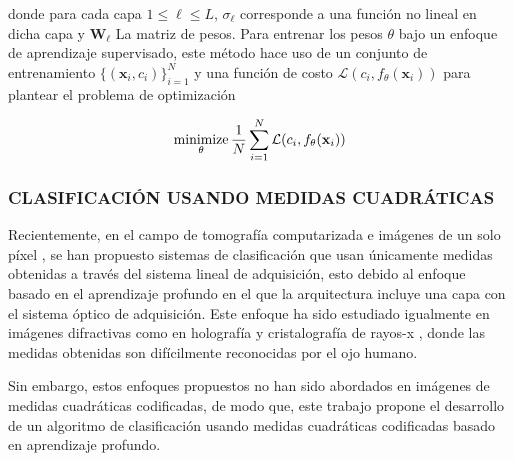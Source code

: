donde para cada capa $1 \leq \ell \leq L$, $\sigma_\ell$ corresponde a una función no lineal en dicha capa y $\mathbf{W}_\ell$ La matriz de pesos. Para entrenar los pesos $\theta$ bajo un enfoque de aprendizaje supervisado, este método hace uso de un conjunto de entrenamiento $\{(\mathbf{x}_i, c_i) \}_{i=1}^{N}$ y una función de costo $\mathcal{L}( c_i,  f_\theta(\mathbf{x}_i))$ para plantear el problema de optimización 

\begin{equation}
    \operatorname*{minimize}_\theta \frac{1}{N}\sum_{i=1}^{N} \mathcal{L}( c_i,  f_\theta(\mathbf{x}_i))
    \label{eq:optimización_nn}
\end{equation}

\subsubsection{CLASIFICACIÓN USANDO MEDIDAS CUADRÁTICAS}
Recientemente, en el campo de tomografía computarizada \cite{douarre2020value} e imágenes de un solo píxel \cite{bacca2020coupled}, se han propuesto sistemas de clasificación que usan únicamente medidas obtenidas a través del sistema lineal de adquisición, esto debido al enfoque basado en el aprendizaje profundo en el que la arquitectura incluye una capa con el sistema óptico de adquisición. Este enfoque ha sido estudiado igualmente en imágenes difractivas como en holografía \cite{kim2018deep} y cristalografía de rayos-x \cite{ziletti2018insightful}, donde las medidas obtenidas son difícilmente reconocidas por el ojo humano. 

Sin embargo, estos enfoques propuestos no han sido abordados en imágenes de medidas cuadráticas codificadas, de modo que, este trabajo propone el desarrollo de un algoritmo de clasificación usando medidas cuadráticas codificadas basado en aprendizaje profundo. 


\pagebreak